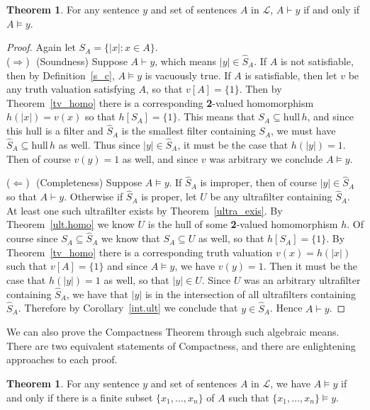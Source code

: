 \documentclass[11pt,titlepage]{article}
\newcommand{\hull}{\text{hull}\,}
\newcommand{\Lan}{\mathcal{L}}
\newcommand{\forward}{\noindent ($\Longrightarrow$) \,\,}
\newcommand{\back}{\noindent ($\Longleftarrow$) \,\,}
\theoremstyle{definition}
\newtheorem{theorem}[definition]{Theorem}
\begin{document}
\begin{theorem}\label{strong} For any sentence $y$ and set of sentences $A$ in $\Lan$, $A\vdash y$ if and only if $A\vDash y$. \end{theorem}

\begin{proof} Again let $S_A=\{|x|: x\in A\}.$\\
\forward (Soundness) Suppose $A\vdash y$, which means $|y| \in \hat{S}_A$. If $A$ is not satisfiable, then by Definition~\ref{s_c}, $A\vDash y$ is vacuously true. If $A$ is satisfiable, then let $v$ be any truth valuation satisfying $A$, so that $v[A]=\{1\}$. Then by Theorem~\ref{tv_homo} there is a corresponding {\bf 2}-valued homomorphism $h(|x|)=v(x)$ so that $h[S_A] =\{1\}$. This means that $S_A\subseteq\hull{h}$, and since this hull is a filter and $\hat{S}_A$ is the smallest filter containing $S_A$, we must have $\hat{S}_A\subseteq \hull h$ as well. Thus since $|y|\in\hat{S}_A$, it must be the case that $h(|y|)=1.$ Then of course $v(y)=1$ as well, and since $v$ was arbitrary we conclude $A\vDash y$.

\back (Completeness) Suppose $A\vDash y.$ If $\hat{S}_A$ is improper, then of course $|y|\in\hat{S}_A$ so that $A\vdash y$. Otherwise if $\hat{S}_A$ is proper, let $U$ be any ultrafilter containing $\hat{S}_A$. At least one such ultrafilter exists by Theorem~\ref{ultra_exis}. By Theorem~\ref{ult.homo} we know $U$ is the hull of some {\bf 2}-valued homomorphism $h$. Of course since $S_A\subseteq\hat{S}_A$ we know that $S_A\subseteq U$ as well, so that $h[S_A]=\{1\}$. By Theorem~\ref{tv_homo} there is a corresponding truth valuation $v(x)=h(|x|)$ such that $v[A]=\{1\}$ and since $A\vDash y$, we have $v(y)=1$. Then it must be the case that $h(|y|)=1$ as well, so that $|y|\in U$. Since $U$ was an arbitrary ultrafilter containing $\hat{S}_A$, we have that $|y|$ is in the intersection of all ultrafilters containing $\hat{S}_A$. Therefore by Corollary~\ref{int.ult} we conclude that $y\in\hat{S}_A$. Hence $A\vdash y$. \end{proof}

We can also prove the Compactness Theorem through such algebraic means. There are two equivalent statements of Compactness, and there are enlightening approaches to each proof.

\begin{theorem} For any sentence $y$ and set of sentences $A$ in $\Lan$, we have $A\vDash y$ if and only if there is a finite subset $\{x_1,\ldots,x_n\}$ of $A$ such that $\{x_1,\ldots,x_n\}\vDash y$.\end{theorem}
\end{document}
